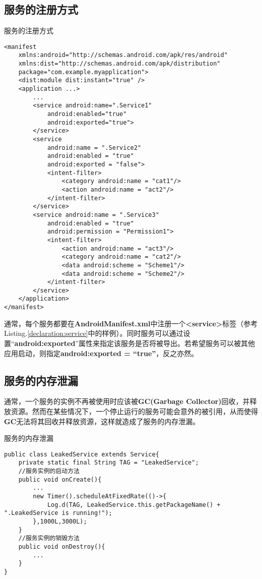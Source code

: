 \subsection{服务的注册方式}
\begin{listing}[htbp]
	\centering
	\caption{服务的注册方式}
	\begin{verbatim}
<manifest
	xmlns:android="http://schemas.android.com/apk/res/android"
	xmlns:dist="http://schemas.android.com/apk/distribution"
	package="com.example.myapplication">
	<dist:module dist:instant="true" />
	<application ...>
		...
		<service android:name=".Service1"
			android:enabled="true"
			android:exported="true">
		</service>
		<service
			android:name = ".Service2"
			android:enabled = "true"
			android:exported = "false">
			<intent-filter>
				<category android:name = "cat1"/>
				<action android:name = "act2"/>
			</intent-filter>
		</service>
		<service android:name = ".Service3"
			android:enabled = "true"
			android:permission = "Permission1">
			<intent-filter>
				<action android:name = "act3"/>
				<category android:name = "cat2"/>
				<data android:scheme = "Scheme1"/>
				<data android:scheme = "Scheme2"/>
			</intent-filter>
		</service>
	</application>
</manifest>
	\end{verbatim}
	\label{declaration:service}
\end{listing}
通常，每个服务都要在\textbf{AndroidManifest.xml}中注册一个\textbf{<service>}标签（参考Listing.\textcolor{red}{\ref{declaration:service}}中的样例）。同时服务可以通过设置“\textbf{android:exported}”属性来指定该服务是否将被导出。若希望服务可以被其他应用启动，则指定\textbf{android:exported = “true”}，反之亦然。
%
%
%
%
%
%
%
%
\subsection{服务的内存泄漏}\label{service_leak}
通常，一个服务的实例不再被使用时应该被\textbf{GC(Garbage Collector)}回收，并释放资源。然而在某些情况下，一个停止运行的服务可能会意外的被引用，从而使得\textbf{GC}无法将其回收并释放资源，这样就造成了服务的内存泄漏。
\begin{listing}[htbp]
	\centering
	\caption{服务的内存泄漏}
	\begin{verbatim}
public class LeakedService extends Service{
	private static final String TAG = "LeakedService";
	//服务实例的启动方法
	public void onCreate(){
		...
		new Timer().scheduleAtFixedRate(()->{
			Log.d(TAG, LeakedService.this.getPackageName() + ".LeakedService is running!");
		},1000L,3000L);
	}
	//服务实例的销毁方法
	public void onDestroy(){
		...
	}
}
	\end{verbatim}
	\label{leaked example:service}
\end{listing}

